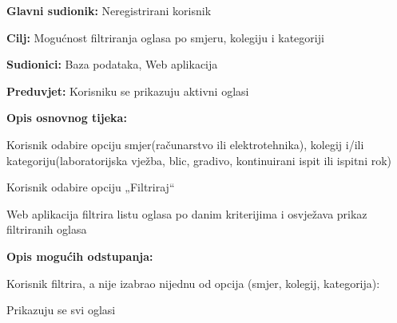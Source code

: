 				
				
					\noindent {}
					\begin{packed_item}
						
						\item \textbf{Glavni sudionik: }Neregistrirani korisnik
						\item  \textbf{Cilj:} Mogućnost filtriranja oglasa po smjeru, kolegiju i kategoriji
						\item  \textbf{Sudionici:} Baza podataka, Web aplikacija
						\item  \textbf{Preduvjet:} Korisniku se prikazuju aktivni oglasi
						\item  \textbf{Opis osnovnog tijeka:}
						
						\item[] \begin{packed_enum}
							\item Korisnik odabire opciju smjer(računarstvo ili elektrotehnika), kolegij i/ili kategoriju(laboratorijska vježba, blic, gradivo, kontinuirani ispit ili ispitni rok)
							\item Korisnik odabire opciju „Filtriraj“ 
							\item Web aplikacija filtrira listu oglasa po danim kriterijima i osvježava prikaz filtriranih oglasa
						\end{packed_enum}
						
						\item  \textbf{Opis mogućih odstupanja:}
						
						\item[] \begin{packed_item}
							
							\item[2.a] Korisnik filtrira, a nije izabrao nijednu od opcija (smjer, kolegij, kategorija):
							\item[] \begin{packed_enum}
								\item Prikazuju se svi oglasi
							\end{packed_enum}
							
						\end{packed_item}
					\end{packed_item}
				
